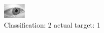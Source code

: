 \begin{figure}[h!]
\begin{center}
\includegraphics[width=0.60\columnwidth]{figures/ID2727_class_2_target_1.png}
\end{center}
\caption{ Classification: 2 actual target: 1}
\label{fig:ID2727_class_2_target_1}
\end{figure}
